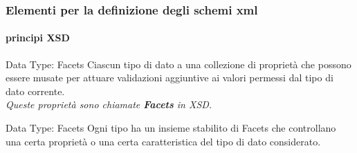 


\begin{frame}
	\frametitle{Elementi per la definizione degli schemi xml}
	\framesubtitle{principi XSD}
	\addtocounter{nframe}{1}

	\begin{block}{Data Type: Facets}
		Ciascun tipo di dato a una collezione di proprietà che possono essere musate per attuare validazioni aggiuntive ai valori permessi dal tipo di dato corrente.
		\\\textit{Queste proprietà sono chiamate \textbf{Facets} in XSD.}
	\end{block}

	\begin{block}{Data Type: Facets}
		Ogni tipo ha un insieme stabilito di Facets che controllano una certa proprietà o una certa caratteristica del tipo di dato considerato.
	\end{block}

\end{frame}

